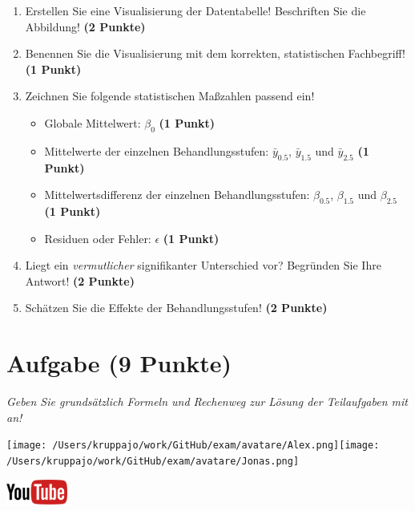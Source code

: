 \documentclass[a4paper, 9pt]{scrartcl}\usepackage[]{graphicx}\usepackage[]{xcolor}
\begin{document}
\begin{enumerate}
\item Erstellen  Sie  eine  Visualisierung  der  Datentabelle! Beschriften  Sie  die  Abbildung! \textbf{(2 Punkte)}
\item Benennen Sie die Visualisierung mit dem korrekten, statistischen Fachbegriff! \textbf{(1 Punkt)}
\item Zeichnen Sie folgende statistischen Maßzahlen passend ein! 
  \begin{itemize}
  \item Globale Mittelwert: $\beta_0$ \textbf{(1 Punkt)}
  \item Mittelwerte der einzelnen Behandlungsstufen: $\bar{y}_{0.5}$, $\bar{y}_{1.5}$ und $\bar{y}_{2.5}$ \textbf{(1 Punkt)}
  \item Mittelwertsdifferenz der einzelnen Behandlungsstufen: $\beta_{0.5}$, $\beta_{1.5}$ und $\beta_{2.5}$ \textbf{(1 Punkt)}
  \item Residuen oder Fehler: $\epsilon$ \textbf{(1 Punkt)}
  \end{itemize}
\item Liegt ein \textit{vermutlicher} signifikanter Unterschied vor? Begründen Sie Ihre Antwort! \textbf{(2 Punkte)}
\item Schätzen Sie die Effekte der Behandlungsstufen! \textbf{(2 Punkte)}
\end{enumerate}
 
\clearpage

\section{Aufgabe \hfill (9 Punkte)}

\textit{Geben Sie grundsätzlich Formeln und Rechenweg zur Lösung der Teilaufgaben mit an!} \\[1Ex]
 

 
\begin{minipage}[t]{0.5\textwidth}
\texttt{[image: /Users/kruppajo/work/GitHub/exam/avatare/Alex.png]}\hspace{-4mm}\texttt{[image: /Users/kruppajo/work/GitHub/exam/avatare/Jonas.png]}
\end{minipage}
\begin{minipage}[t]{0.5\textwidth}
\hfill
\href{https://youtu.be/IhecxMcCENY}{\includegraphics[width = 2cm]{img/youtube}}
\end{minipage}
\vspace{1ex}
\end{document}
